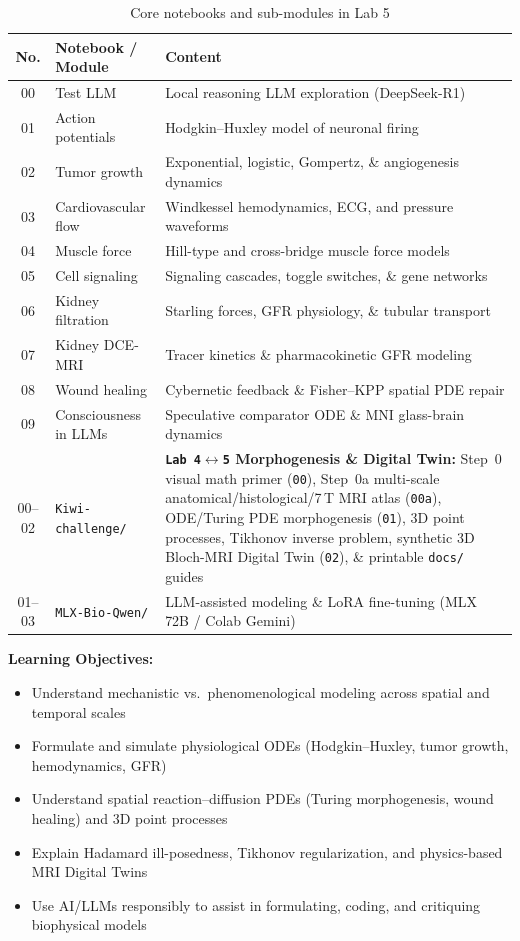 \documentclass[11pt,a4paper]{article}
\begin{document}
\begin{table}[htbp]
\centering
\caption{Core notebooks and sub-modules in Lab 5}
\label{tab:lab5}
\begin{tabular}{@{}clp{7.0cm}@{}}
\toprule
\textbf{No.} & \textbf{Notebook / Module} & \textbf{Content} \\
\midrule
00 & Test LLM & Local reasoning LLM exploration (DeepSeek-R1) \\
01 & Action potentials & Hodgkin--Huxley model of neuronal firing \\
02 & Tumor growth & Exponential, logistic, Gompertz, \& angiogenesis dynamics \\
03 & Cardiovascular flow & Windkessel hemodynamics, ECG, and pressure waveforms \\
04 & Muscle force & Hill-type and cross-bridge muscle force models \\
05 & Cell signaling & Signaling cascades, toggle switches, \& gene networks \\
06 & Kidney filtration & Starling forces, GFR physiology, \& tubular transport \\
07 & Kidney DCE-MRI & Tracer kinetics \& pharmacokinetic GFR modeling \\
08 & Wound healing & Cybernetic feedback \& Fisher--KPP spatial PDE repair \\
09 & Consciousness in LLMs & Speculative comparator ODE \& MNI glass-brain dynamics \\
\midrule
00--02 & \texttt{Kiwi-challenge/} & \textbf{\texttt{Lab 4$\leftrightarrow$5} Morphogenesis \& Digital Twin:} Step~0 visual math primer (\texttt{00}), Step~0a multi-scale anatomical/histological/7\,T MRI atlas (\texttt{00a}), ODE/Turing PDE morphogenesis (\texttt{01}), 3D point processes, Tikhonov inverse problem, synthetic 3D Bloch-MRI Digital Twin (\texttt{02}), \& printable \texttt{docs/} guides \\
01--03 & \texttt{MLX-Bio-Qwen/} & LLM-assisted modeling \& LoRA fine-tuning (MLX 72B / Colab Gemini) \\
\bottomrule
\end{tabular}
\end{table}

\textbf{Learning Objectives:}
\begin{itemize}[nosep]
    \item Understand mechanistic vs.\ phenomenological modeling across spatial and temporal scales
    \item Formulate and simulate physiological ODEs (Hodgkin--Huxley, tumor growth, hemodynamics, GFR)
    \item Understand spatial reaction--diffusion PDEs (Turing morphogenesis, wound healing) and 3D point processes
    \item Explain Hadamard ill-posedness, Tikhonov regularization, and physics-based MRI Digital Twins
    \item Use AI/LLMs responsibly to assist in formulating, coding, and critiquing biophysical models
\end{itemize}
\end{document}
